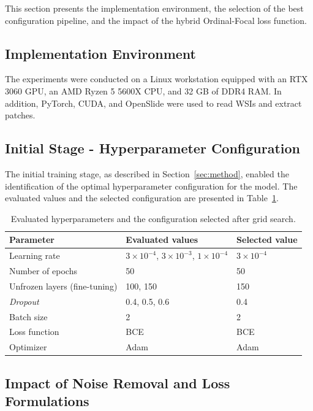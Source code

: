 This section presents the implementation environment, the selection of the best configuration pipeline, and the impact of the hybrid Ordinal-Focal loss function.

\subsection{Implementation Environment}

The experiments were conducted on a Linux workstation equipped with an RTX 3060 GPU, an AMD Ryzen 5 5600X CPU, and 32 GB of DDR4 RAM. In addition, PyTorch, CUDA, and OpenSlide were used to read WSIs and extract patches.

\subsection{Initial Stage - Hyperparameter Configuration}
\label{subsec:hiper}

The initial training stage, as described in Section~\ref{sec:method}, enabled the identification of the optimal hyperparameter configuration for the model. The evaluated values and the selected configuration are presented in Table~\ref{tab:hiperparametros_gridsearch}.

\begin{table}[htb]
\centering
\begin{tabular}{lll}
\toprule
\textbf{Parameter} & \textbf{Evaluated values} & \textbf{Selected value} \\
\midrule
Learning rate & $3\times10^{-4}$, $3\times10^{-3}$, $1\times10^{-4}$ & $3\times10^{-4}$ \\
Number of epochs & 50 & 50 \\
Unfrozen layers (fine-tuning) & 100, 150 & 150 \\
\textit{Dropout} & 0.4, 0.5, 0.6 & 0.4 \\
Batch size & 2 & 2 \\
Loss function & BCE & BCE \\
Optimizer & Adam & Adam \\
\bottomrule
\end{tabular}
\caption{Evaluated hyperparameters and the configuration selected after grid search.}
\label{tab:hiperparametros_gridsearch}
\end{table}

\subsection{Impact of Noise Removal and Loss Formulations}

